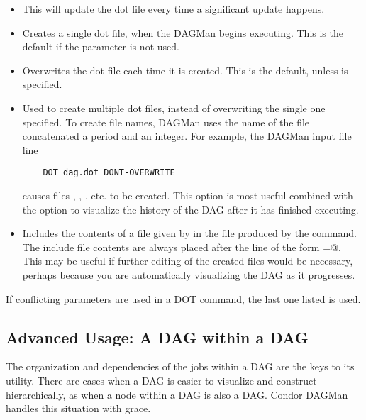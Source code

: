 \begin{itemize}

\item {}  This will update the dot file every time a
significant update happens. 

\item {} Creates a single dot file, when
the DAGMan begins executing. This is the default if the parameter
 is not used.

\item {} Overwrites the dot file each time it
is created. This is the default, unless 
is specified.

\item {} Used to create multiple dot files, instead
of overwriting the single one specified.
To create file names,
DAGMan uses the name of the file concatenated a period and an
integer. For example, the DAGMan input file line
\begin{verbatim}
    DOT dag.dot DONT-OVERWRITE
\end{verbatim}
causes files
,
,
,
etc. to be created.
This option is
most useful combined with the  option to
visualize the history of the DAG after it has finished executing. 

\item {} Includes the contents
of a file given by  in the file produced by the
 command.
The include file contents are always placed after the line of
the form
\verb@label=@.
This may be useful if further editing of the created files would
be necessary,
perhaps because you are automatically visualizing the DAG as it
progresses. 

\end{itemize}

If conflicting parameters are used in a DOT command, the last one
listed is used.
\subsection{\label{sec:DAGsinDAGs}Advanced Usage: A DAG within a DAG}

The organization and dependencies of the jobs within a DAG
are the keys to its utility.
There are cases when a DAG is easier to visualize and 
construct hierarchically,
as when a node within a DAG is also a DAG.
Condor DAGMan handles this situation with grace.

